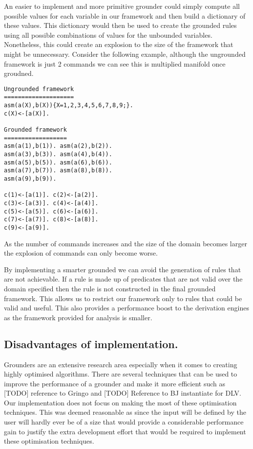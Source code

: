 An easier to implement and more primitive grounder could simply compute all possible values for each variable in our framework and then build a dictionary of these values. This dictionary would then be used to create the grounded rules using all possible combinations of values for the unbounded variables. Nonetheless, this could create an explosion to the size of the framework that might be unnecessary. Consider the following example, although the ungrounded framework is just 2 commands we can see this is multiplied manifold once groudned.

\begin{Verbatim}[frame=single]
Ungrounded framework
====================
asm(a(X),b(X)){X=1,2,3,4,5,6,7,8,9;}.
c(X)<-[a(X)].

Grounded framework
==================
asm(a(1),b(1)). asm(a(2),b(2)).
asm(a(3),b(3)). asm(a(4),b(4)).
asm(a(5),b(5)). asm(a(6),b(6)).
asm(a(7),b(7)). asm(a(8),b(8)).
asm(a(9),b(9)).

c(1)<-[a(1)]. c(2)<-[a(2)].
c(3)<-[a(3)]. c(4)<-[a(4)].
c(5)<-[a(5)]. c(6)<-[a(6)].
c(7)<-[a(7)]. c(8)<-[a(8)].
c(9)<-[a(9)].
\end{Verbatim}

As the number of commands increases and the size of the domain becomes larger the explosion of commands can only become worse.

By implementing a smarter grounded we can avoid the generation of rules that are not achievable. If a rule is made up of predicates that are not valid over the domain specified then the rule is not constructed in the final grounded framework. This allows us to restrict our framework only to rules that could be valid and useful. This also provides a performance boost to the derivation engines as the framework provided for analysis is smaller.

\subsection{Disadvantages of implementation.}

Grounders are an extensive research area especially when it comes to creating highly optimised algorithms. There are several techniques that can be used to improve the performance of a grounder and make it more efficient such as [TODO] reference to Gringo and [TODO] Reference to BJ instantiate for DLV. Our implementation does not focus on making the most of these optimisation techniques. This was deemed reasonable as since the input will be defined  by the user will hardly ever be of a size that would provide a considerable performance gain to justify the extra development effort that would be required to implement these optimisation techniques.

